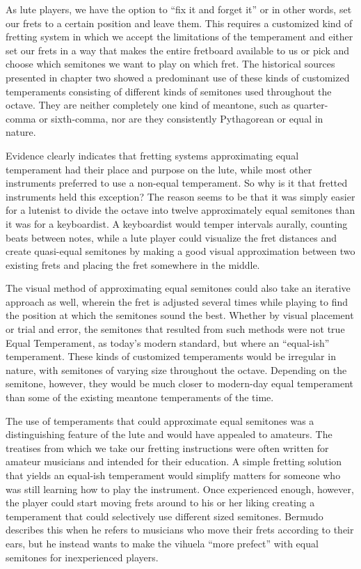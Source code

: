 As lute players, we have the option to ``fix it and forget it'' or in other words, set
our frets to a certain position and leave them. This requires a customized kind of
fretting system in which we accept the limitations of the temperament and either set
our frets in a way that makes the entire fretboard available to us or pick and choose
which semitones we want to play on which fret. The historical sources presented in
chapter two showed a predominant use of these kinds of customized temperaments
consisting of different kinds of semitones used throughout the octave. They are neither
completely one kind of meantone, such as quarter-comma or sixth-comma, nor are they
consistently Pythagorean or equal in nature.

Evidence clearly indicates that fretting systems approximating equal temperament had
their place and purpose on the lute, while most other instruments preferred to use a
non-equal temperament.  So why is it that fretted instruments held this exception? The
reason seems to be that it was simply easier for a lutenist to divide the octave into
twelve approximately equal semitones than it was for a keyboardist. A keyboardist would
temper intervals aurally, counting beats between notes, while a lute player could
visualize the fret distances and create quasi-equal semitones by making a good
visual approximation between two existing frets and placing the fret somewhere in the
middle.

The visual method of approximating equal semitones could also take an iterative approach as well,
wherein the fret is adjusted several times while playing to find the position at which the semitones
sound the best. Whether by visual placement or trial and error, the semitones that resulted from
such methods were not true Equal Temperament, as today's modern standard, but where an ``equal-ish''
temperament. These kinds of customized temperaments would be irregular in nature, with semitones of
varying size throughout the octave.  Depending on the semitone, however, they would be much closer
to modern-day equal temperament than some of the existing meantone temperaments of the time.

The use of temperaments that could approximate equal semitones was a distinguishing
feature of the lute and would have appealed to amateurs. The treatises from which we
take our fretting instructions were often written for amateur musicians and intended
for their education. A simple fretting solution that yields an equal-ish temperament
would simplify matters for someone who was still learning how to play the instrument.
Once experienced enough, however, the player could start moving frets around to his or
her liking creating a temperament that could selectively use different sized
semitones. Bermudo describes this when he refers to musicians who move their
frets according to their ears, but he instead wants to make the vihuela ``more
prefect'' with equal semitones for inexperienced players.\autocite[78]{DE:1}

